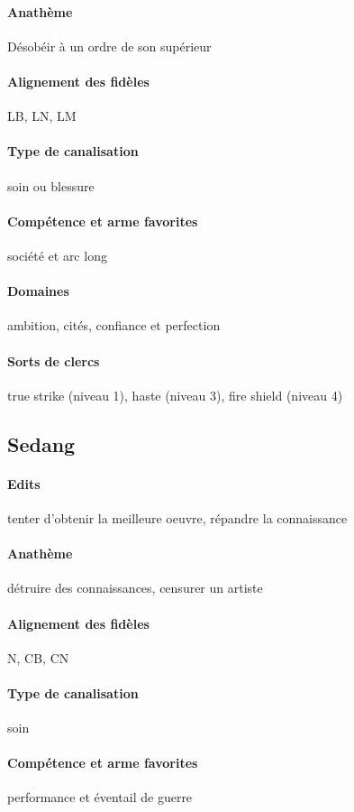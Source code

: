\documentclass[10pt,a4paper]{book}
\begin{document}
\paragraph{Anathème}Désobéir à un ordre de son supérieur
\paragraph{Alignement des fidèles}LB, LN, LM
\paragraph{Type de canalisation}soin ou blessure
\paragraph{Compétence et arme favorites}société et arc long
\paragraph{Domaines}ambition, cités, confiance et perfection
\paragraph{Sorts de clercs}true strike (niveau 1), haste (niveau 3), fire shield (niveau 4)
\subsection{Sedang}
\paragraph{Edits}tenter d'obtenir la meilleure oeuvre, répandre la connaissance
\paragraph{Anathème}détruire des connaissances, censurer un artiste
\paragraph{Alignement des fidèles} N, CB, CN
\paragraph{Type de canalisation}soin
\paragraph{Compétence et arme favorites}performance et éventail de guerre
\end{document}
